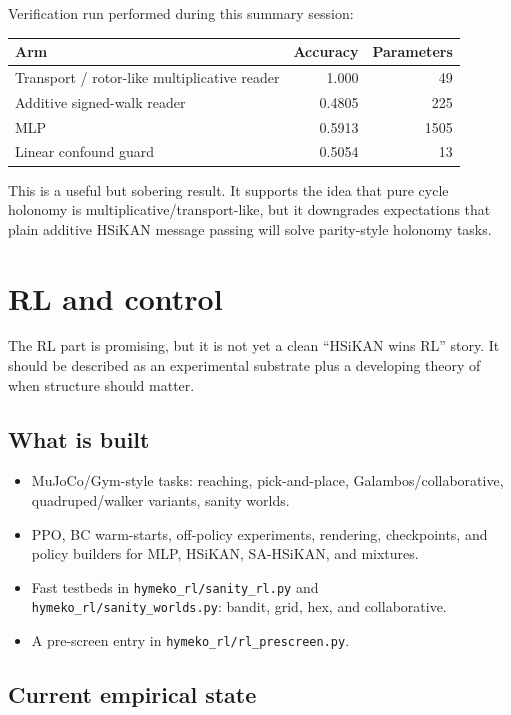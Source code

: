 \documentclass[11pt]{article}
\newcommand{\pathref}[1]{\nolinkurl{#1}}
\begin{document}
Verification run performed during this summary session:
\begin{center}\small
\begin{tabular}{lrr}
\toprule
Arm & Accuracy & Parameters \\
\midrule
Transport / rotor-like multiplicative reader & 1.000 & 49 \\
Additive signed-walk reader & 0.4805 & 225 \\
MLP & 0.5913 & 1505 \\
Linear confound guard & 0.5054 & 13 \\
\bottomrule
\end{tabular}
\end{center}

This is a useful but sobering result. It supports the idea that pure cycle
holonomy is multiplicative/transport-like, but it downgrades expectations that
plain additive HSiKAN message passing will solve parity-style holonomy tasks.

\section{RL and control}

The RL part is promising, but it is not yet a clean ``HSiKAN wins RL'' story.
It should be described as an experimental substrate plus a developing theory of
when structure should matter.

\subsection*{What is built}

\begin{itemize}[nosep]
  \item MuJoCo/Gym-style tasks: reaching, pick-and-place, Galambos/collaborative,
  quadruped/walker variants, sanity worlds.
  \item PPO, BC warm-starts, off-policy experiments, rendering, checkpoints, and
  policy builders for MLP, HSiKAN, SA-HSiKAN, and mixtures.
  \item Fast testbeds in \pathref{hymeko_rl/sanity_rl.py} and
  \pathref{hymeko_rl/sanity_worlds.py}: bandit, grid, hex, and collaborative.
  \item A pre-screen entry in \pathref{hymeko_rl/rl_prescreen.py}.
\end{itemize}

\subsection*{Current empirical state}
\end{document}
